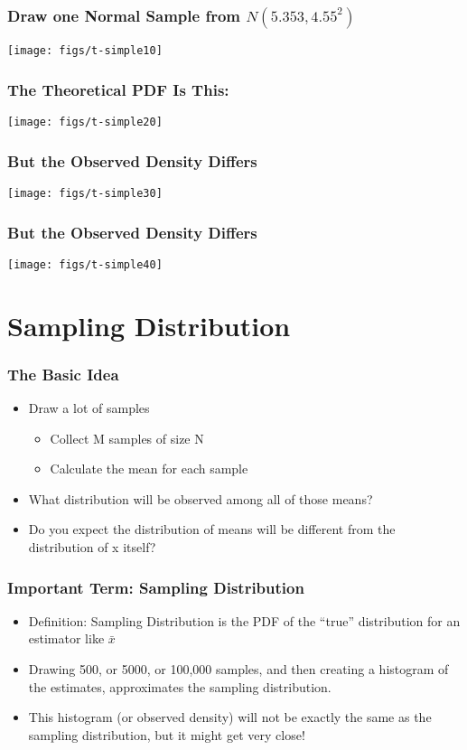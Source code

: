 \documentclass[10pt,english]{beamer}
\begin{document}
\begin{frame}[containsverbatim]
  \frametitle{Draw one Normal Sample from $N(5.353, 4.55^{2})$ }

\texttt{[image: figs/t-simple10]}
\end{frame}


\begin{frame}[containsverbatim]
  \frametitle{The Theoretical PDF Is This:}

\texttt{[image: figs/t-simple20]}
\end{frame}


\begin{frame}[containsverbatim]
  \frametitle{But the Observed Density Differs}

\texttt{[image: figs/t-simple30]}
\end{frame}

\begin{frame}[containsverbatim]
  \frametitle{But the Observed Density Differs}

\texttt{[image: figs/t-simple40]}
\end{frame}

\section{Sampling Distribution}

\begin{frame}
  \frametitle{The Basic Idea}
  \begin{itemize}
    \item Draw a lot of samples
      \begin{itemize}
      \item Collect M samples of size N
      \item Calculate the mean for each sample
      \end{itemize}
  \item What distribution will be observed among all of those means?
  \item Do you expect the distribution of means will be different
    from the distribution of x itself?
  \end{itemize}
\end{frame}

\begin{frame}
  \frametitle{Important Term: Sampling Distribution}
  \begin{itemize}
  \item Definition: Sampling Distribution is the PDF of the ``true'' distribution for an  estimator like $\bar{x}$
  \item Drawing 500, or 5000,  or 100,000 samples, and then creating a histogram
    of the estimates, approximates the sampling distribution.
  \item This histogram (or observed density) will not be exactly the
    same as the sampling distribution, but it might get very close!
  \end{itemize}
\end{frame}
\end{document}
